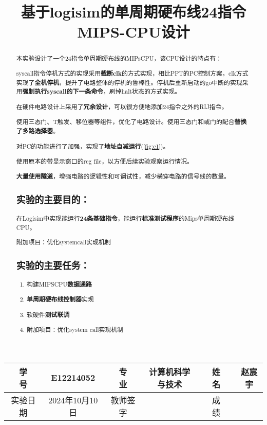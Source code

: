 \documentclass[withoutpreface]{cumcmthesis}
\title{基于logisim的单周期硬布线24指令MIPS-CPU设计}
\begin{document}
\maketitle
\begin{tabular}{cccccc}
	\hline
	学　　号 & E12214052 &专　　业 & 计算机科学与技术 &姓　　名 & 赵宸宇 \\
	\hline
	实验日期 & 2024年10月10日 &教师签字 &  &成　　绩&\\
	\hline
\end{tabular}
\begin{abstract}
	本实验设计了一个24指令单周期硬布线的MIPsCPU，该CPU设计的特点有：

	syscall指令停机方式的实现采用\textbf{截断clk}的方式实现，相比PPT的PC控制方案，clk方式实现了\textbf{全机停机}，提升了电路整体的停机的鲁棒性。停机后重新启动的go中断的实现采用\textbf{强制执行syscall的下一条命令}，刷掉halt状态的方式实现。

	在硬件电路设计上采用了\textbf{冗余设计}，可以很方便地添加24指令之外的RIJ指令。

	使用三态门、T触发、移位器等组件，优化了电路设计。使用三态门和或门的配合\textbf{替换了多路选择器}。

	对PC的功能进行了加强，实现了\textbf{地址自减运行}(\cref{fig:c1})。

	使用原本的带显示窗口的reg file，以方便后续实验观察运行情况。

	\textbf{大量使用隧道}，增强电路的逻辑性和可调试性，减少横穿电路的信号线的数量。


	\subsection*{实验的主要目的：}

	在Logisim中实现能运行\textbf{24条基础指令}，能运行\textbf{标准测试程序}的Mips单周期硬布线CPU。

	附加项目：优化systemcall实现机制

	\subsection*{实验的主要任务：}

	\begin{enumerate}
		\item 构建MIPSCPU\textbf{数据通路}
		\item \textbf{单周期硬布线控制器}实现
		\item 软硬件\textbf{测试联调}
		\item 附加项目：优化system call实现机制



\end{enumerate}
\end{abstract}
\end{document}
